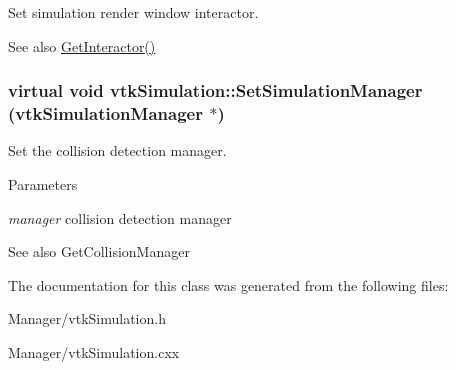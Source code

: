 Set simulation render window interactor. 

\begin{DoxySeeAlso}{See also}
\hyperlink{classvtkSimulation_a80ce57f6226a646fd8faf2fac1767a64}{GetInteractor()} 
\end{DoxySeeAlso}
\hypertarget{classvtkSimulation_a244662f687e733e277feaf5c7dcdae6c}{
\subsubsection[{SetSimulationManager}]{\setlength{\rightskip}{0pt plus 5cm}virtual void vtkSimulation::SetSimulationManager ({\bf vtkSimulationManager} $\ast$)}}
\label{classvtkSimulation_a244662f687e733e277feaf5c7dcdae6c}


Set the collision detection manager. 


\begin{DoxyParams}{Parameters}
\item[{\em manager}]collision detection manager \end{DoxyParams}
\begin{DoxySeeAlso}{See also}
GetCollisionManager 
\end{DoxySeeAlso}


The documentation for this class was generated from the following files:\begin{DoxyCompactItemize}
\item 
Manager/vtkSimulation.h\item 
Manager/vtkSimulation.cxx\end{DoxyCompactItemize}
